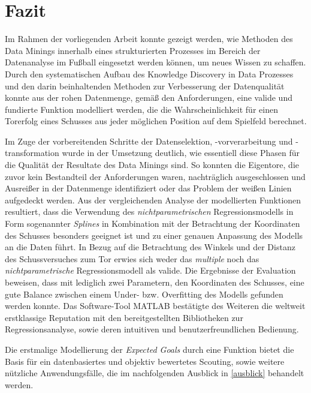 \section{Fazit}
Im Rahmen der vorliegenden Arbeit konnte gezeigt werden, wie Methoden des Data Minings innerhalb eines strukturierten Prozesses im Bereich der Datenanalyse im Fußball eingesetzt werden können, um neues Wissen zu schaffen. Durch den systematischen Aufbau des Knowledge Discovery in Data Prozesses und den darin beinhaltenden Methoden zur Verbesserung der Datenqualität konnte aus der rohen Datenmenge, gemäß den Anforderungen, eine valide und fundierte Funktion modelliert werden, die die Wahrscheinlichkeit für einen Torerfolg eines Schusses aus jeder möglichen Position auf dem Spielfeld berechnet. 

Im Zuge der vorbereitenden Schritte der Datenselektion, -vorverarbeitung und -transformation wurde in der Umsetzung deutlich, wie essentiell diese Phasen für die Qualität der Resultate des Data Minings sind. So konnten die Eigentore, die zuvor kein Bestandteil der Anforderungen waren, nachträglich ausgeschlossen und Ausreißer in der Datenmenge identifiziert oder das Problem der weißen Linien aufgedeckt werden. Aus der vergleichenden Analyse der modellierten Funktionen resultiert, dass die Verwendung des \textit{nichtparametrischen} Regressionsmodells in Form sogenannter \textit{Splines} in Kombination mit der Betrachtung der Koordinaten des Schusses besonders geeignet ist und zu einer genauen Anpassung des Modells an die Daten führt. In Bezug auf die Betrachtung des Winkels und der Distanz des Schussversuches zum Tor erwies sich weder das \textit{multiple} noch das \textit{nichtparametrische} Regressionsmodell als valide. Die Ergebnisse der Evaluation beweisen, dass mit lediglich zwei Parametern, den Koordinaten des Schusses, eine gute Balance zwischen einem Under- bzw. Overfitting des Modells gefunden werden konnte. Das Software-Tool MATLAB bestätigte des Weiteren die weltweit erstklassige Reputation mit den bereitgestellten Bibliotheken zur Regressionsanalyse, sowie deren intuitiven und benutzerfreundlichen Bedienung. \enlargethispage{2\baselineskip} 

Die erstmalige Modellierung der \textit{Expected Goals} durch eine Funktion bietet die Basis für ein datenbasiertes und objektiv bewertetes Scouting, sowie weitere nützliche Anwendungsfälle, die im nachfolgenden Ausblick in \vref{ausblick} behandelt werden.

